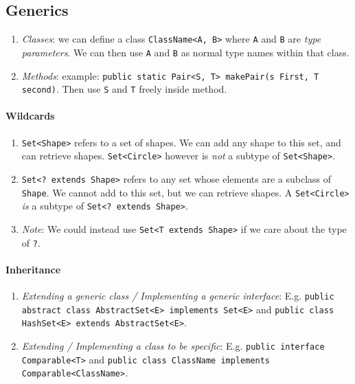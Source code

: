 \documentclass[twocolumn,english]{article}
\begin{document}
\subsection{Generics}
\begin{enumerate}
\item \emph{Classes}: we can define a class \texttt{ClassName\textless{}A,
B\textgreater{}} where \texttt{A} and \texttt{B} are \emph{type parameters}.
We can then use \texttt{A} and \texttt{B} as normal type names within
that class.
\item \emph{Methods}: example: \texttt{public static Pair\textless{}S, T\textgreater{} makePair(s First, T second)}. Then
use \texttt{S} and \texttt{T} freely inside method.
\end{enumerate}

\paragraph{Wildcards}
\begin{enumerate}
\item \texttt{Set\textless{}Shape\textgreater{}} refers to a set of shapes.
We can add any shape to this set, and can retrieve shapes. \texttt{Set\textless{}Circle\textgreater{}}
however is \emph{not} a subtype of \texttt{Set\textless{}Shape\textgreater{}}.
\item \texttt{Set\textless{}? extends Shape\textgreater{}} refers to any
set whose elements are a subclass of \texttt{Shape}. We cannot add
to this set, but we can retrieve shapes. A \texttt{Set\textless{}Circle\textgreater{}}
\emph{is} a subtype of \texttt{Set\textless{}? extends Shape\textgreater{}}.
\item \emph{Note}: We could instead use \texttt{Set\textless{}T extends
Shape\textgreater{}} if we care about the type of \texttt{?}.
\end{enumerate}

\paragraph{Inheritance}
\begin{enumerate}
\item \emph{Extending a generic class / Implementing a generic interface}:
E.g. \texttt{public abstract class AbstractSet\textless{}E\textgreater{}
implements Set\textless{}E\textgreater{}} and \texttt{public class
HashSet\textless{}E\textgreater{} extends AbstractSet\textless{}E\textgreater{}}.
\item \emph{Extending / Implementing a class to be specific}: E.g. \texttt{public
interface Comparable\textless{}T\textgreater{}} and \texttt{public
class ClassName implements Comparable\textless{}ClassName\textgreater{}}.
\end{enumerate}
\end{document}
